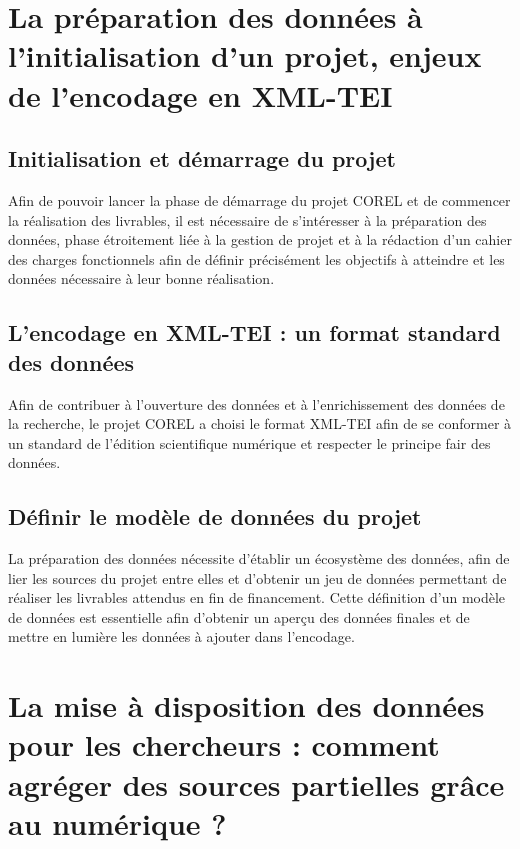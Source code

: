 \documentclass[a4paper,12pt,twoside]{book}
\newcommand{\fair}{\gls{fair}\xspace}
\newcommand{\COREL}{\gls{COREL}\xspace}
\newcommand{\XML}{\gls{XML}\xspace}
\newcommand{\TEI}{\gls{TEI}\xspace}
\newcommand{\clearemptydoublepage}{\newpage{\pagestyle{empty}\cleardoublepage}}
\begin{document}
        \clearemptydoublepage


    \part{La préparation des données à l’initialisation d’un projet, enjeux de l’encodage en XML-TEI}
        \chapter{Initialisation et démarrage du projet}
        Afin de pouvoir lancer la phase de démarrage du projet \COREL et de commencer la réalisation des livrables, il est nécessaire de s'intéresser à la préparation des données, phase étroitement liée à la gestion de projet et à la rédaction d'un cahier des charges fonctionnels afin de définir précisément les objectifs à atteindre et les données nécessaire à leur bonne réalisation.
                    
            
        \clearemptydoublepage
        
        \chapter{L’encodage en XML-TEI : un format standard des données}
        Afin de contribuer à l'ouverture des données et à l'enrichissement des données de la recherche, le projet \COREL a choisi le format \XML-\TEI afin de se conformer à un standard de l'édition scientifique numérique et respecter le principe \fair des données.
                    
             
            
        \clearemptydoublepage
        
        \chapter{Définir le modèle de données du projet}
        La préparation des données nécessite d'établir un écosystème des données, afin de lier les sources du projet entre elles et d'obtenir un jeu de données permettant de réaliser les livrables attendus en fin de financement. Cette définition d'un modèle de données est essentielle afin d'obtenir un aperçu des données finales et de mettre en lumière les données à ajouter dans l'encodage.
                    
             
            
        \clearemptydoublepage

    \part{La mise à disposition des données pour les chercheurs : comment agréger des sources partielles grâce au numérique ?}
\end{document}
